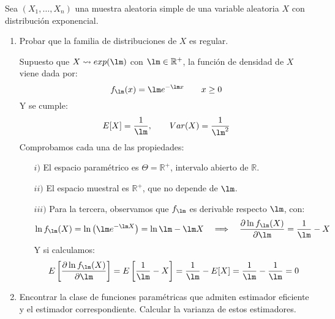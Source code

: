 \begin{ejercicio}\label{ej:9_rel4} %
    Sea $(X_1, \ldots, X_n)$ una muestra aleatoria simple de una variable aleatoria $X$ con distribución exponencial.
    \begin{enumerate}[label=\alph*)]
        \item Probar que la familia de distribuciones de $X$ es regular.

            Supuesto que $X\rightsquigarrow exp(\lm)$ con $\lm\in \mathbb{R}^+$, la función de densidad de $X$ viene dada por:
            \begin{equation*}
                f_\lm(x) = \lm e^{-\lm x} \qquad x\geq 0
            \end{equation*}
            Y se cumple:
            \begin{equation*}
                E[X] = \frac{1}{\lm}, \qquad Var(X) = \frac{1}{\lm^2}
            \end{equation*}
            Comprobamos cada una de las propiedades:
            \begin{enumerate}
                \item[$i)$] El espacio paramétrico es $\Theta=\mathbb{R}^+$, intervalo abierto de $\mathbb{R}$.
                \item[$ii)$] El espacio muestral es $\mathbb{R}^+$, que no depende de $\lm$.
                \item[$iii)$] Para la tercera, observamos que $f_\lm$ es derivable respecto $\lm$, con:
                    \begin{equation*}
                        \ln f_\lm(X) = \ln\left(\lm e^{-\lm X}\right) = \ln\lm - \lm X \quad \Longrightarrow \quad  \dfrac{\partial \ln f_\lm(X)}{\partial \lm} = \frac{1}{\lm} - X
                    \end{equation*}
                    Y si calculamos:
                    \begin{equation*}
                        E\left[\dfrac{\partial \ln f_\lm(X)}{\partial \lm}\right] = E\left[\frac{1}{\lm}-X\right] = \frac{1}{\lm}-E[X] = \frac{1}{\lm}-\frac{1}{\lm} = 0
                    \end{equation*}
            \end{enumerate}
        \item Encontrar la clase de funciones paramétricas que admiten estimador eficiente y el estimador correspondiente. Calcular la varianza de estos estimadores.


\end{enumerate}
\end{ejercicio}
